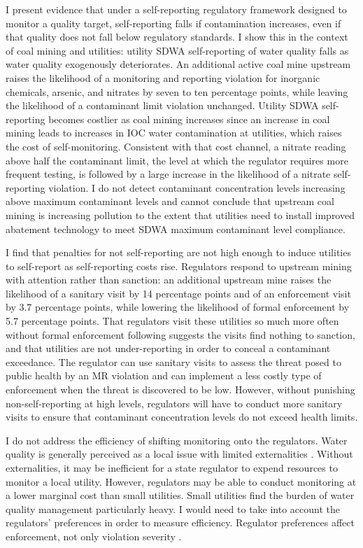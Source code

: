 \documentclass[12pt]{article}
\begin{document}
I present evidence that under a self-reporting regulatory framework designed to monitor a quality target, self-reporting falls if contamination increases, even if that quality does not fall below regulatory standards. I show this in the context of coal mining and utilities: utility SDWA self-reporting of water quality falls as water quality exogenously deteriorates. An additional active coal mine upstream raises the likelihood of a monitoring and reporting violation for inorganic chemicals, arsenic, and nitrates by seven to ten percentage points, while leaving the likelihood of a contaminant limit violation unchanged. Utility SDWA self-reporting becomes costlier as coal mining increases since an increase in coal mining leads to increases in IOC water contamination at utilities, which raises the cost of self-monitoring. Consistent with that cost channel, a nitrate reading above half the contaminant limit, the level at which the regulator requires more frequent testing, is followed by a large increase in the likelihood of a nitrate self-reporting violation. I do not detect contaminant concentration levels increasing above maximum contaminant levels and cannot conclude that upstream coal mining is increasing pollution to the extent that utilities need to install improved abatement technology to meet SDWA maximum contaminant level compliance. 

I find that penalties for not self-reporting are not high enough to induce utilities to self-report as self-reporting costs rise. Regulators respond to upstream mining with attention rather than sanction: an additional upstream mine raises the likelihood of a sanitary visit by 14 percentage points and of an enforcement visit by 3.7 percentage points, while lowering the likelihood of formal enforcement by 5.7 percentage points. That regulators visit these utilities so much more often without formal enforcement following suggests the visits find nothing to sanction, and that utilities are not under-reporting in order to conceal a contaminant exceedance. The regulator can use sanitary visits to assess the threat posed to public health by an MR violation and can implement a less costly type of enforcement when the threat is discovered to be low. However, without punishing non-self-reporting at high levels, regulators will have to conduct more sanitary visits to ensure that contaminant concentration levels do not exceed health limits.

I do not address the efficiency of shifting monitoring onto the regulators. Water quality is generally perceived as a local issue with limited externalities \parencite{olmstead2010economics}. Without externalities, it may be inefficient for a state regulator to expend resources to monitor a local utility. However, regulators may be able to conduct monitoring at a lower marginal cost than small utilities. Small utilities find the burden of water quality management particularly heavy. I would need to take into account the regulators' preferences in order to measure efficiency. Regulator preferences affect enforcement, not only violation severity \parencite{kang2021understanding}.
\end{document}
